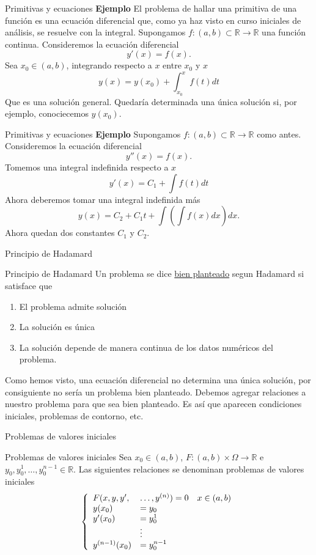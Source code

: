 \documentclass[handout,hyperref={colorlinks=true}]{beamer}
\newcommand{\rr}{\mathbb{R}}
\newcommand{\nl}{\onslide<+-> }
\begin{document}
\begin{frame}{Primitivas y ecuaciones}
\textbf{Ejemplo} El problema de hallar una primitiva de una función es una ecuación diferencial que, como ya haz visto en curso iniciales de análisis, se resuelve 
con la integral. Supongamos $f:(a,b)\subset \rr\to\rr$ una función continua. Consideremos la ecuación diferencial
\[y'(x)=f(x).\]
Sea $x_0\in(a,b)$, integrando respecto a $x$ entre $x_0$ y $x$
\[y(x)=y(x_0)+\int_{x_0}^xf(t)dt\]
Que es una solución general. Quedaría determinada una única solución si, por ejemplo, conociecemos $y(x_0)$.
\end{frame}

\begin{frame}{Primitivas y ecuaciones}
\textbf{Ejemplo} Supongamos $f:(a,b)\subset \rr\to\rr$ como antes. Consideremos la ecuación diferencial
\[y''(x)=f(x).\]
Tomemos una integral indefinida respecto a $x$ 
\[y'(x)=C_1+\int f(t)dt\]
Ahora deberemos tomar una integral indefinida más
\[y(x)=C_2+C_1t +\int\left(\int f(x)dx\right)dx.\]
Ahora quedan dos constantes $C_1$ y $C_2$. 
\end{frame}


\begin{frame}{Principio de Hadamard}
\nl \begin{block}{Principio de Hadamard}
 Un problema se dice \href{http://es.wikipedia.org/wiki/Problema_bien_definido}{bien planteado} segun Hadamard si satisface que
 \begin{enumerate}
  \item El problema admite solución
  \item La solución es única
  \item La solución depende de manera continua de los datos numéricos del problema.
 \end{enumerate}
 \end{block}
\nl Como hemos visto, una ecuación diferencial no determina una única solución, por consiguiente no sería un problema bien planteado. Debemos agregar relaciones
a nuestro problema para que sea bien planteado. Es así que aparecen condiciones iniciales, problemas de contorno, etc.
 


\end{frame}


\begin{frame}{Problemas de valores iniciales}
\begin{block}{Problemas de valores iniciales} Sea $x_0\in(a,b)$, $F:(a,b)\times \Omega\to\rr$ e $y_0,y_0^1,\ldots,y_0^{n-1}\in\rr$. Las siguientes relaciones  se denominan problemas de 
valores iniciales
\[
 \left\{\begin{array}{l l l}
         F(x,y,y',&\ldots,y^{(n)})=0& x\in(a,b)\\
         y(x_0)&=y_0&\\
         y'(x_0)&=y_0^1&\\
          & \vdots &\\
          y^{(n-1)}(x_0)&=y_0^{n-1}&\\
        \end{array}
   \right.
\]
\end{block}
\end{frame}
\end{document}
